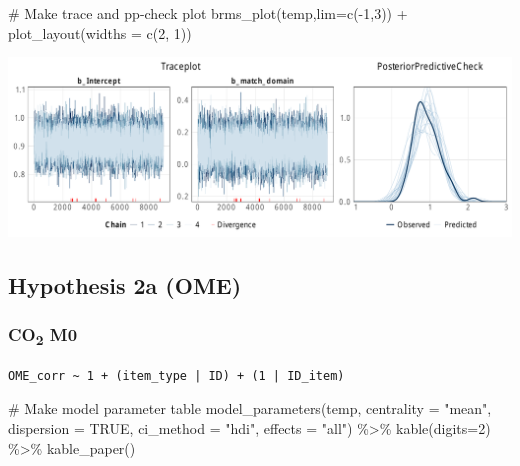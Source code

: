 \documentclass[
  letterpaper,
  DIV=11,
  numbers=noendperiod]{scrartcl}
\newenvironment{Shaded}{\begin{snugshade}}{\end{snugshade}}
\newcommand{\AttributeTok}[1]{\textcolor[rgb]{0.40,0.45,0.13}{#1}}
\newcommand{\CommentTok}[1]{\textcolor[rgb]{0.37,0.37,0.37}{#1}}
\newcommand{\ConstantTok}[1]{\textcolor[rgb]{0.56,0.35,0.01}{#1}}
\newcommand{\DecValTok}[1]{\textcolor[rgb]{0.68,0.00,0.00}{#1}}
\newcommand{\FunctionTok}[1]{\textcolor[rgb]{0.28,0.35,0.67}{#1}}
\newcommand{\NormalTok}[1]{\textcolor[rgb]{0.00,0.23,0.31}{#1}}
\newcommand{\OtherTok}[1]{\textcolor[rgb]{0.00,0.23,0.31}{#1}}
\newcommand{\SpecialCharTok}[1]{\textcolor[rgb]{0.37,0.37,0.37}{#1}}
\newcommand{\StringTok}[1]{\textcolor[rgb]{0.13,0.47,0.30}{#1}}
\begin{document}
\begin{Shaded}
\begin{Highlighting}[]
\CommentTok{\# Make trace and pp{-}check plot}
\FunctionTok{brms\_plot}\NormalTok{(temp,}\AttributeTok{lim=}\FunctionTok{c}\NormalTok{(}\SpecialCharTok{{-}}\DecValTok{1}\NormalTok{,}\DecValTok{3}\NormalTok{))  }\SpecialCharTok{+} \FunctionTok{plot\_layout}\NormalTok{(}\AttributeTok{widths =} \FunctionTok{c}\NormalTok{(}\DecValTok{2}\NormalTok{, }\DecValTok{1}\NormalTok{))}
\end{Highlighting}
\end{Shaded}

\includegraphics{supplement_files/figure-pdf/h1bM1kcal-1.pdf}

\subsection{Hypothesis 2a (OME)}\label{hypothesis-2a-ome}

\subsubsection{\texorpdfstring{CO\textsubscript{2}
M0}{CO2 M0}}\label{co2-m0-2}

\begin{Shaded}
\end{Shaded}

\begin{verbatim}
OME_corr ~ 1 + (item_type | ID) + (1 | ID_item) 
\end{verbatim}

\begin{Shaded}
\begin{Highlighting}[]
\CommentTok{\# Make model parameter table}
\FunctionTok{model\_parameters}\NormalTok{(temp, }\AttributeTok{centrality =} \StringTok{"mean"}\NormalTok{, }\AttributeTok{dispersion =} \ConstantTok{TRUE}\NormalTok{, }
                 \AttributeTok{ci\_method =} \StringTok{"hdi"}\NormalTok{, }\AttributeTok{effects =} \StringTok{"all"}\NormalTok{) }\SpecialCharTok{\%\textgreater{}\%} 
  \FunctionTok{kable}\NormalTok{(}\AttributeTok{digits=}\DecValTok{2}\NormalTok{) }\SpecialCharTok{\%\textgreater{}\%} \FunctionTok{kable\_paper}\NormalTok{()}
\end{Highlighting}
\end{Shaded}
\end{document}
